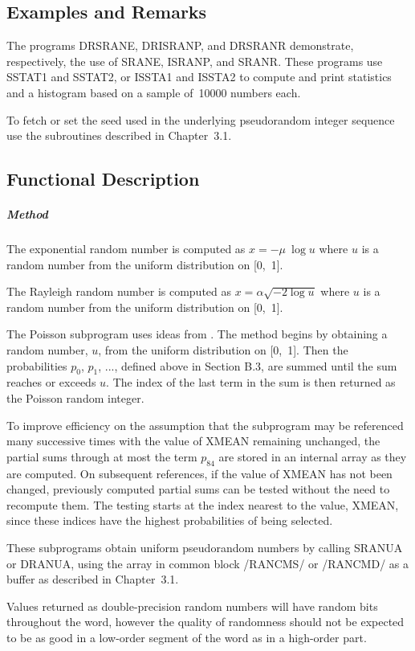 \documentclass[twoside]{MATH77}
\begin{document}
\subsection{Examples and Remarks}

The programs DRSRANE, DRISRANP, and DRSRANR demonstrate, respectively, the
use of SRANE, ISRANP, and SRANR. These programs use SSTAT1 and SSTAT2, or
ISSTA1 and ISSTA2 to compute and print statistics and a histogram based on a
sample of~10000 numbers each.

To fetch or set the seed used in the underlying pseudorandom integer
sequence use the subroutines described in Chapter~3.1.

\subsection{Functional Description}

\subparagraph{Method}

The exponential random number is computed as $x = -\mu \ \log u$ where $u$
is a random number from the uniform distribution on [0,~1].

The Rayleigh random number is computed as $x = \alpha \sqrt{-2 \log u}$
where $u$ is a random number from the uniform distribution on [0,~1].

The Poisson subprogram uses ideas from \cite{Snow:1968:A342}.  The method
begins by obtaining a random number, $u$, from the uniform distribution on
[0,~1].  Then the probabilities $p_0$, $p_1$, ..., defined above in
Section B.3, are summed until the sum reaches or exceeds $u$.  The index
of the last term in the sum is then returned as the Poisson random
integer.

To improve efficiency on the assumption that the subprogram may be
referenced many successive times with the value of XMEAN remaining
unchanged, the partial sums through at most the term $p_{84}$ are stored in
an internal array as they are computed. On subsequent references, if the
value of XMEAN has not been changed, previously computed partial sums can be
tested without the need to recompute them. The testing starts at the index
nearest to the value, XMEAN, since these indices have the highest
probabilities of being selected.

These subprograms obtain uniform pseudorandom numbers by calling SRANUA or
DRANUA, using the array in common block /RANCMS/ or /RANCMD/ as a buffer as
described in Chapter~3.1.

Values returned as double-precision random numbers will have random bits
throughout the word, however the quality of randomness should not be
expected to be as good in a low-order segment of the word as in a high-order
part.
\end{document}
